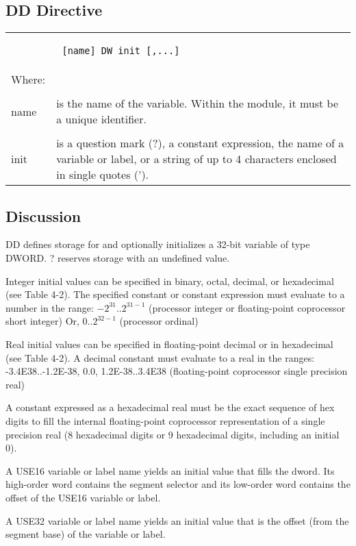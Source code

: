 \subsection*{DD Directive} 

\begin{tabular}{p{2cm} p{12.5cm}}
& \begin{verbatim} [name] DW init [,...] \end{verbatim} \\
Where: & \\
& \\
name & is the name of the variable. Within the module, it must be a unique identifier. \\
& \\
init & is a question mark (?), a constant expression, the name of a variable or label, or a string of up to 4 characters enclosed in single quotes (').\\
\end{tabular}

\subsection*{Discussion}
DD defines storage for and optionally initializes a 32-bit variable of type DWORD. ? reserves storage with an undefined value.

Integer initial values can be specified in binary, octal, decimal, or hexadecimal (see Table 4-2). The specified constant or constant expression must evaluate to a number in the range:
$-2^{31}$..$2^{31-1}$ (processor integer or floating-point coprocessor short integer) Or, 0..$2^{32-1}$ (processor ordinal)

Real initial values can be specified in floating-point decimal or in hexadecimal (see Table 4-2). A decimal constant must evaluate to a real in the ranges:
-3.4E38..-1.2E-38, 0.0, 1.2E-38..3.4E38 (floating-point coprocessor single precision real)

A constant expressed as a hexadecimal real must be the exact sequence of hex digits to fill the internal floating-point coprocessor representation of a single precision real (8 hexadecimal digits or 9 hexadecimal digits, including an initial 0).

A USE16 variable or label name yields an initial value that fills the dword. Its high-order word contains the segment selector and its low-order word contains the offset of the USE16 variable or label.

A USE32 variable or label name yields an initial value that is the offset (from the segment base) of the variable or label.

